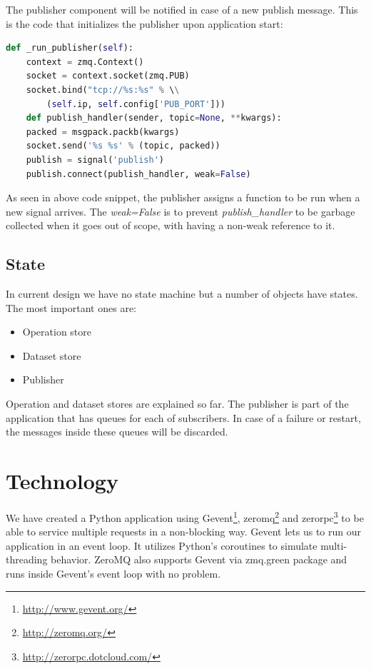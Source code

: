The publisher component will be notified in case of a new publish message. 
This is the code that initializes the publisher upon application start:

\begin{lstlisting}[language=python, caption={Initializing the publisher upon application start}]
def _run_publisher(self):
    context = zmq.Context()
    socket = context.socket(zmq.PUB)
    socket.bind("tcp://%s:%s" % \\
    	(self.ip, self.config['PUB_PORT']))
    def publish_handler(sender, topic=None, **kwargs):
	packed = msgpack.packb(kwargs)
	socket.send('%s %s' % (topic, packed))
    publish = signal('publish')
    publish.connect(publish_handler, weak=False)
\end{lstlisting}

As seen in above code snippet, the publisher assigns a function to be run when
a new signal arrives. The \textit{weak=False} is to prevent \textit{publish\_handler}
to be garbage collected when it goes out of scope, with having a non-weak reference to it.

\subsection{State}
In current design we have no state machine but a number of objects have states.
The most important ones are:
\begin{itemize}
\item Operation store
\item Dataset store
\item Publisher
\end{itemize}

Operation and dataset stores are explained so far. 
The publisher is part of the application that has queues for each of subscribers.
In case of a failure or restart, the messages inside these queues will be discarded.

\section{Technology}
We have created a Python application using Gevent\footnote{\url{http://www.gevent.org/}},
zeromq\footnote{\url{http://zeromq.org/}} and zerorpc\footnote{\url{http://zerorpc.dotcloud.com/}} 
to be able to service multiple requests in a non-blocking way. 
Gevent lets us to run our application in an event loop. 
It utilizes Python's coroutines to simulate multi-threading behavior. 
ZeroMQ also supports Gevent via zmq.green package and runs inside Gevent's event loop with no problem.

